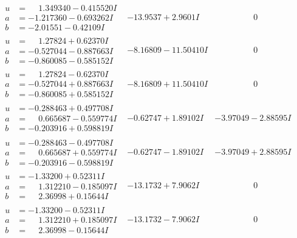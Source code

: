 \documentclass[1p]{elsarticle_modified}
\theoremstyle{definition}
\begin{document}
$$\begin{array}{c|c|c}
\begin{aligned}
u &= \phantom{-}1.349340 - 0.415520 I \\
a &= -1.217360 - 0.693262 I \\
b &= -2.01551 - 0.42109 I\end{aligned}
 & -13.9537 + 2.9601 I & \phantom{-0.000000 } 0 \\ \hline\begin{aligned}
u &= \phantom{-}1.27824 + 0.62370 I \\
a &= -0.527044 - 0.887663 I \\
b &= -0.860085 - 0.585152 I\end{aligned}
 & -8.16809 - 11.50410 I & \phantom{-0.000000 } 0 \\ \hline\begin{aligned}
u &= \phantom{-}1.27824 - 0.62370 I \\
a &= -0.527044 + 0.887663 I \\
b &= -0.860085 + 0.585152 I\end{aligned}
 & -8.16809 + 11.50410 I & \phantom{-0.000000 } 0 \\ \hline\begin{aligned}
u &= -0.288463 + 0.497708 I \\
a &= \phantom{-}0.665687 - 0.559774 I \\
b &= -0.203916 + 0.598819 I\end{aligned}
 & -0.62747 + 1.89102 I & -3.97049 - 2.88595 I \\ \hline\begin{aligned}
u &= -0.288463 - 0.497708 I \\
a &= \phantom{-}0.665687 + 0.559774 I \\
b &= -0.203916 - 0.598819 I\end{aligned}
 & -0.62747 - 1.89102 I & -3.97049 + 2.88595 I \\ \hline\begin{aligned}
u &= -1.33200 + 0.52311 I \\
a &= \phantom{-}1.312210 - 0.185097 I \\
b &= \phantom{-}2.36998 + 0.15644 I\end{aligned}
 & -13.1732 + 7.9062 I & \phantom{-0.000000 } 0 \\ \hline\begin{aligned}
u &= -1.33200 - 0.52311 I \\
a &= \phantom{-}1.312210 + 0.185097 I \\
b &= \phantom{-}2.36998 - 0.15644 I\end{aligned}
 & -13.1732 - 7.9062 I & \phantom{-0.000000 } 0 \\ \hline\begin{aligned}

\end{aligned}
\end{array}$$
\end{document}
